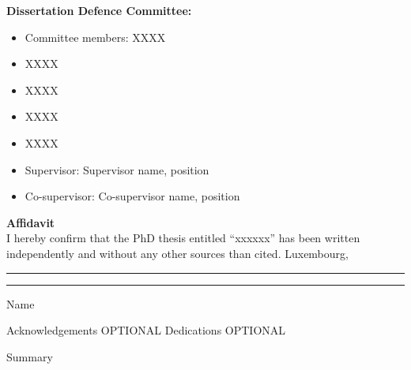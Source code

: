 \documentclass[11pt,a4paper]{report}
\begin{document}
\vfill
\noindent \textbf{Dissertation Defence Committee:}
\vspace{0.2cm}
\begin{itemize}[leftmargin=0cm]
\item[] Committee members: \hspace{2cm} XXXX
	\item[] \hspace{5.8cm} XXXX
	\item[] \hspace{5.8cm} XXXX
	\item[] \hspace{5.8cm} XXXX
	\item[] \hspace{5.8cm} XXXX
\end{itemize}
\begin{itemize}[leftmargin=0cm]
	\item[] Supervisor: \hspace{3.6cm} Supervisor name, position
\end{itemize}
\begin{itemize}[leftmargin=0cm]
	\item[] Co-supervisor: \hspace{3.1cm} Co-supervisor name, position
\end{itemize}


\newpage

\noindent \textbf{\large{Affidavit}}\\
\newline
I hereby confirm that the PhD thesis entitled “xxxxxx” has been written independently and without any other sources than cited.
\vspace{2.5cm}
\newline
\noindent Luxembourg, \rule{4cm}{0.4pt}  \hspace{2cm} \rule{6cm}{0.4pt}
\newline 
\hspace*{9cm} Name


\newpage
Acknowledgements OPTIONAL
\newpage
Dedications OPTIONAL
\newpage
\renewcommand*\contentsname{Index}
\tableofcontents
\newpage
\listoffigures
\listoftables
\newpage
Summary
\newpage


\setcounter{page}{1}
\end{document}

